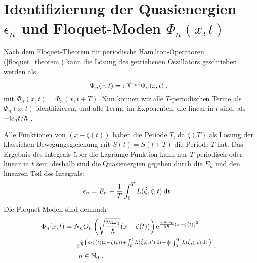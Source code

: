   \section{\texorpdfstring{Identifizierung der Quasienergien $\epsilon_n$ und Floquet-Moden $\Phi_n(x,t)$}{Identifizierung der Quasienergien epsilon_n und Floquet-Moden Phi_n(x,t)}}
    Nach dem Floquet-Theorem für periodische Hamilton-Operatoren (\ref{floquet_theorem}) kann die Lösung des getriebenen Oszillators geschrieben werden als
    \begin{equation}
      \Psi_n(x,t) = \text e^{\frac{-\text i}{\hbar}\epsilon_nt}\Phi_n(x,t) \; ,
    \end{equation}
    mit $\Phi_n(x,t)=\Phi_n(x,t+T)$.
    Nun können wir alle $T$-periodischen Terme als $\Phi_n(x,t)$ identifizieren, und alle Terme im Exponenten, die linear in $t$ sind, als $-\text i\epsilon_n t/\hbar$ \cite{haengi}.

    Alle Funktionen von $(x-\zeta(t))$ haben die Periode $T$, da $\zeta(T)$ als Lösung der klassichen Bewegungsgleichung mit $S(t)=S(t+T)$ die Periode $T$ hat. Das
    Ergebnis des Integrals über die Lagrange-Funktion kann nur $T$-periodisch oder linear in $t$ sein, deshalb sind die Quasienergien gegeben durch die $E_n$ und den linearen Teil des Integrals:
    \begin{equation}
      \epsilon_n = E_n - \frac{1}{T} \int_0^T L(\dot \zeta, \zeta, t) \: \text d t \; .
    \end{equation}
    Die Floquet-Moden sind demnach
    \begin{align}
      \begin{split}
        \Phi_n(x,t) &=
         N_nO_n\left(\sqrt{\frac{m\omega_0}{\hbar}}(x-\zeta(t))\right) \text e^{\frac{-m\omega_0}{2\hbar}(x-\zeta(t))^2} \\
        &\quad \cdot \text e^{\frac{\text i}{\hbar}\left(m\dot \zeta(t)(x-\zeta(t))+\int_0^tL(\dot \zeta,\zeta,t')\:\text d t-\frac{t}{T} \int_0^T L(\dot \zeta,\zeta,t)\:\text dt\: \right)} \; , \\
        &\quad \quad n \in \mathbb{N}_0 \; .
        \label{floquet_moden_einzelner}
      \end{split}
    \end{align}



